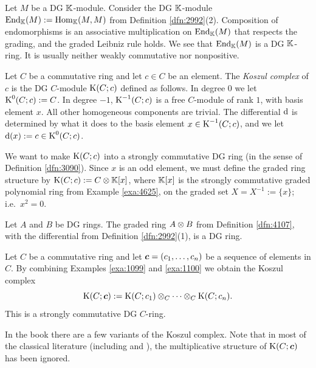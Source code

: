 \begin{exa} \label{exa:1098}
Let $M$ be a DG $\mathbb{K}$-module. Consider the DG $\mathbb{K}$-module \lb 
$\operatorname{End}_{\mathbb{K}}(M) := \operatorname{Hom}_{\mathbb{K}}(M, M)$
from Definition \ref{dfn:2992}(2). 
Composition of endomorphisms is an associative 
multiplication on $\operatorname{End}_{\mathbb{K}}(M)$ that respects the grading, and the graded 
Leibniz rule holds. We see that 
$\operatorname{End}_{\mathbb{K}}(M)$ is a DG $\mathbb{K}$-ring.
It is usually neither weakly commutative nor nonpositive. 
\end{exa}

\begin{exa} \label{exa:1099}
Let $C$ be a commutative ring and let $c \in C$ be an element. 
The {\em Koszul complex}
 of $c$ is the DG $C$-module $\operatorname{K}(C; c)$ defined as 
follows. In degree $0$ we let $\operatorname{K}^0(C; c) := C$. 
In degree $-1$, $\operatorname{K}^{-1}(C; c)$ is a free $C$-module of rank $1$, with 
basis element $x$. All other homogeneous components are trivial. The 
differential $\mathrm{d}$ is determined by what it does to the basis element
$x \in \operatorname{K}^{-1}(C; c)$, and we let 
$\mathrm{d}(x) := c \in \operatorname{K}^{0}(C; c)$. 

We want to make $\operatorname{K}(C; c)$ into a strongly commutative DG ring
(in the sense of Definition \ref{dfn:3090}). Since $x$ is an odd element,
we must define the graded ring structure by 
$\operatorname{K}(C; c) := C \otimes \mathbb{K}[x]$,
where $\mathbb{K}[x]$ is the strongly commutative graded polynomial ring from Example 
\ref{exa:4625}, on the graded set 
$X = X^{-1} := \{ x \}$; i.e.\ $x^2 = 0$. 
\end{exa}

\begin{exa} \label{exa:1100}
Let $A$ and $B$ be DG rings. The graded ring 
$A \otimes B$ from Definition \ref{dfn:4107}, with the differential
from Definition \ref{dfn:2992}(1),
is a DG ring.
\end{exa}

\begin{exa} \label{exa:1101}
Let $C$ be a commutative ring and let 
$\boldsymbol{c} = (c_1, \ldots, c_n)$ be a sequence of elements in $C$. By combining 
Examples \ref{exa:1099} and \ref{exa:1100} we obtain the Koszul complex 
\[ \operatorname{K}(C; \boldsymbol{c}) := \operatorname{K}(C; c_1) \otimes_{C} \cdots \otimes_{C}
\operatorname{K}(C; c_n) . \]
This is a strongly commutative DG $C$-ring.
\end{exa}

\begin{rem} \label{rem:4685}
In the book \cite[Section 17, Exercises]{Eis} there are a few variants of the 
Koszul complex. Note that in most of the classical literature (including 
\cite{Eis} and \cite{Mats}), the multiplicative structure of $\operatorname{K}(C; 
\boldsymbol{c})$ has been ignored. 
\end{rem}

